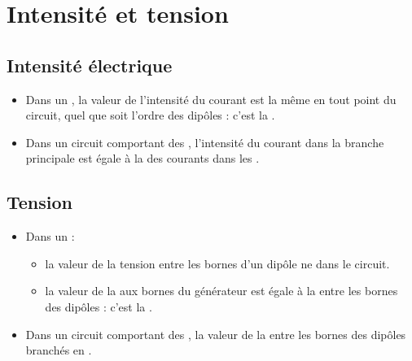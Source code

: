 \documentclass[12pt,a4paper]{article}
\begin{document}
	
	

\section{Intensité et tension}


\subsection{Intensité électrique}

\begin{mybilan}
	\begin{itemize}
		\item Dans un , la valeur de l'intensité du courant est la même en tout point du circuit, quel que soit l'ordre des dipôles : c'est la .
			
			
		\item Dans un circuit comportant des , l'intensité du courant dans la branche principale est égale à la  des courants dans les .		
		
	\end{itemize}
\end{mybilan}


\subsection{Tension}

\begin{mybilan}
	\begin{itemize}
		\item Dans un  :
		\begin{itemize}
			\item la valeur de la tension entre les bornes d'un dipôle ne  dans le circuit.
			\item la valeur de la  aux bornes du générateur est égale à la  entre les bornes des dipôles : c'est la .
		\end{itemize}
			
					
		\item Dans un circuit comportant des , la valeur de la  entre les bornes des dipôles branchés en .
		
		
	\end{itemize}
\end{mybilan}
\end{document}
